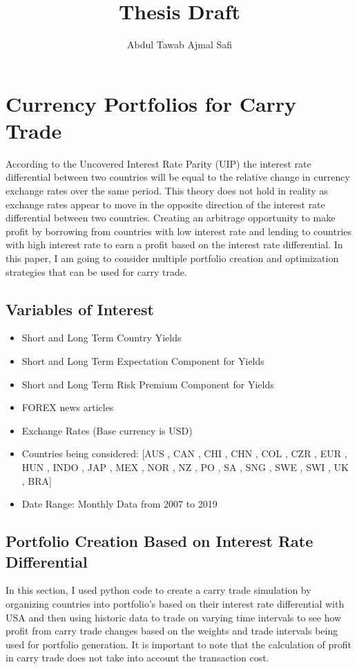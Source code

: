 \documentclass{article}
\begin{document}
\title{Thesis Draft}
\author{Abdul Tawab Ajmal Safi}

\maketitle

\newpage
\tableofcontents
\newpage
\section{Currency Portfolios for Carry Trade}
According to the Uncovered Interest Rate Parity (UIP) the interest rate differential between two countries
will be equal to the relative change in currency exchange rates over the same period. This theory does not hold in reality
as exchange rates appear to move in the opposite direction of the interest rate differential between two countries. Creating an
arbitrage opportunity to make profit by borrowing from countries with low interest rate and lending to countries with high
interest rate to earn a profit based on the interest rate differential. In this paper, I am going to consider multiple portfolio creation
and optimization strategies that can be used for carry trade.


\subsection{Variables of Interest}
\begin{itemize}
  \item Short and Long Term Country Yields
  \item Short and Long Term Expectation Component for Yields
  \item Short and Long Term Risk Premium Component for Yields
  \item FOREX news articles
  \item Exchange Rates (Base currency is USD)
  \item Countries being considered: [AUS ,  CAN ,  CHI ,  CHN ,  COL ,  CZR ,  EUR ,  HUN ,
                       INDO ,  JAP ,  MEX ,  NOR ,  NZ ,  PO , SA ,  SNG , SWE ,  SWI ,  UK  , BRA]
  \item Date Range: Monthly Data from 2007 to 2019
\end{itemize}

\newpage

\subsection{Portfolio Creation Based on Interest Rate Differential}
In this section, I used python code to create a carry trade simulation by organizing countries into portfolio's
based on their interest rate differential with USA and then using historic data to trade on varying time intervals
to see how profit from carry trade changes based on the weights and trade intervals being used for portfolio generation.
It is important to note that the calculation of profit in carry trade does not take into account the transaction cost.
\end{document}
